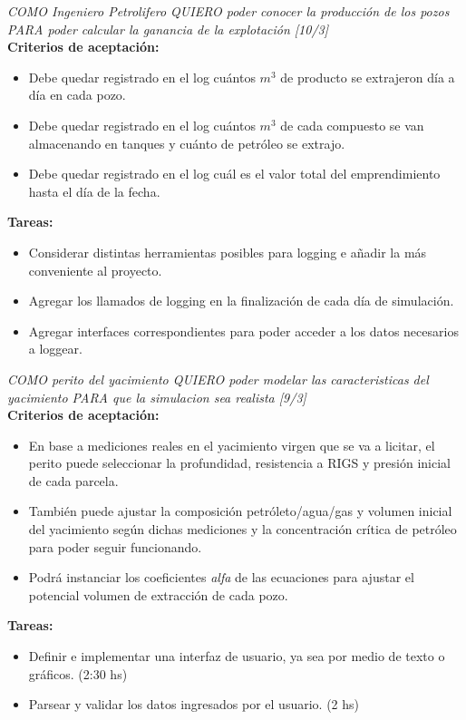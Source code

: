 \begin{tcolorbox}
\textit{COMO Ingeniero Petrolifero QUIERO poder conocer la producción de los pozos PARA poder calcular la ganancia de la explotación [10/3]}\\

\textbf{Criterios de aceptación:}
\begin{itemize}
	\item Debe quedar registrado en el log cuántos $m^3$ de producto se extrajeron día a día en cada pozo.
    \item Debe quedar registrado en el log cuántos $m^3$ de cada compuesto se van almacenando en tanques y cuánto de petróleo se extrajo. 
    \item Debe quedar registrado en el log cuál es el valor total del emprendimiento hasta el día de la fecha.  
\end{itemize}

\textbf{Tareas:}
\begin{itemize}
	\item Considerar distintas herramientas posibles para logging e añadir la más conveniente al proyecto. 
    \item Agregar los llamados de logging en la finalización de cada día de simulación. 
    \item Agregar interfaces correspondientes para poder acceder a los datos necesarios a loggear. 
\end{itemize}
\end{tcolorbox}

\begin{tcolorbox}
\textit{COMO perito del yacimiento QUIERO poder modelar las caracteristicas del yacimiento PARA que la simulacion sea realista [9/3]}\\

\textbf{Criterios de aceptación:}
\begin{itemize}
	\item En base a mediciones reales en el yacimiento virgen que se va a licitar, el perito puede seleccionar la profundidad, resistencia a RIGS y presión inicial de cada parcela.

    \item También puede ajustar la composición petróleto/agua/gas y volumen inicial del yacimiento según dichas mediciones y la concentración crítica de petróleo para poder seguir funcionando.

    \item Podrá instanciar los coeficientes \textit{alfa} de las ecuaciones para ajustar el potencial volumen de extracción de cada pozo.
\end{itemize}

\textbf{Tareas:}
\begin{itemize}
	\item Definir e implementar una interfaz de usuario, ya sea por medio de texto o gráficos. (2:30 hs)
    \item Parsear y validar los datos ingresados por el usuario. (2 hs)
\end{itemize}
\end{tcolorbox}
